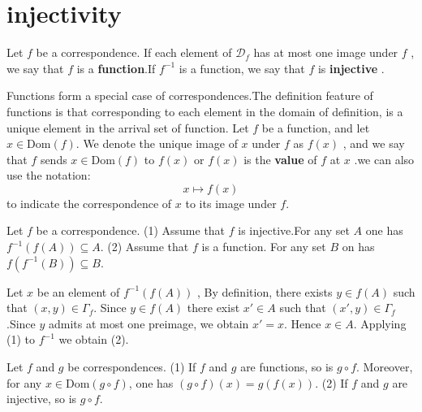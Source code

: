 \section{injectivity}
\begin{definitionenv}
    Let $f$ be a correspondence. If each element of $\mathscr{D}_f$ has at most one image under $f$ ,  we say that $f$ is a \textbf{function}.If $f^{-1}$ is a function,  we say that $f$ is \textbf{injective} .
\end{definitionenv}
\begin{notationenv}
    Functions form a special case of correspondences.The definition feature of functions is that corresponding to each element in the domain of definition,  is a unique element in the arrival set of function.
    \newline
    Let $f$ be a function, and let $x\in \mathrm{Dom}(f)$. We denote the unique image of $x$ under $f$ as $f(x)$ , and we say that $f$ sends $x\in \mathrm{Dom}(f)$ to $f(x)$ or $f(x)$  is the \textbf{value} of $f$ at $x$ .we can also use the notation:
    $$x\mapsto f(x)$$
    to indicate the correspondence of $x$ to its image under $f$.
\end{notationenv}
\begin{propositionenv}\label{proposition3.6.1}
    Let $f$ be a correspondence.
    \newline
    (1) Assume that $f$ is injective.For any set $A$ one has $f^{-1}(f(A))\subseteq A$.
    \newline
    (2) Assume that $f$ is a function. For any set $B$ on has $f(f^{-1}(B))\subseteq B$. 
\end{propositionenv}
\begin{proofenv}
    Let $x$ be an element of $f^{-1}(f(A))$ , By definition, there exists $y\in f(A)$ such that $(x, y)\in \Gamma_f$. Since $y\in f(A) $ there exist $x'\in A$ such that $(x', y)\in \Gamma_f$.Since $y$ admits at most one preimage,  we obtain $x'=x$. Hence $x\in A$.
    \newline
    Applying (1) to $f^{-1}$ we obtain (2).
\end{proofenv}
\begin{propositionenv}\label{proposition3.6.2}
    Let \( f \) and \( g \) be correspondences.
\newline
    (1) If \( f \) and \( g \) are functions,  so is \( g \circ f \). Moreover,  for any \( x \in \text{Dom}(g \circ f) \),  one has \((g \circ f)(x) = g(f(x))\).
    \newline
    (2) If \( f \) and \( g \) are injective,  so is \( g \circ f \).

\end{propositionenv}
